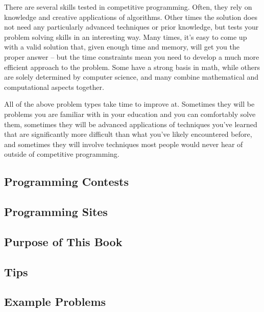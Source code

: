 There are several skills tested in competitive programming. Often, they rely on knowledge and creative applications of algorithms. Other times the solution does not need any particularly advanced techniques or prior knowledge, but tests your problem solving skills in an interesting way. Many times, it's easy to come up with a valid solution that, given enough time and memory, will get you the proper answer -- but the time constraints mean you need to develop a much more efficient approach to the problem. Some have a strong basis in math, while others are solely determined by computer science, and many combine mathematical and computational aspects together.

All of the above problem types take time to improve at. Sometimes they will be problems you are familiar with in your education and you can comfortably solve them, sometimes they will be advanced applications of techniques you've learned that are significantly more difficult than what you've likely encountered before, and sometimes they will involve techniques most people would never hear of outside of competitive programming.

\subsection{Programming Contests}
\subsection{Programming Sites}
\subsection{Purpose of This Book}
\subsection{Tips}
\subsection{Example Problems}